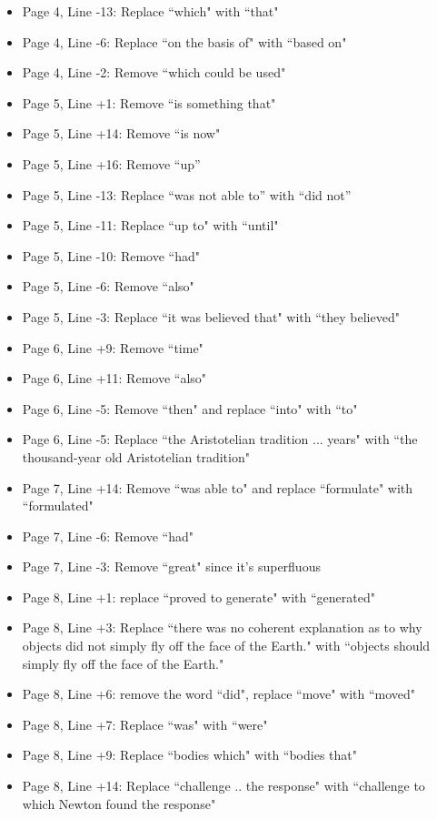 \documentclass[11pt]{article}
\begin{document}
\begin{itemize}
\begin{itemize}
		\item Page 4, Line -13: Replace ``which" with ``that"
		\item Page 4, Line -6: Replace ``on the basis of" with ``based on"
		\item Page 4, Line -2: Remove ``which could be used"
		\item Page 5, Line +1: Remove ``is something that"
		\item Page 5, Line +14: Remove ``is now"
		\item Page 5, Line +16: Remove ``up”
		\item Page 5, Line -13: Replace ``was not able to” with ``did not”
		\item Page 5, Line -11: Replace ``up to" with ``until"
		\item Page 5, Line -10: Remove ``had"
		\item Page 5, Line -6: Remove ``also"
		\item Page 5, Line -3: Replace ``it was believed that" with ``they believed"
		\item Page 6, Line +9: Remove ``time"
		\item Page 6, Line +11: Remove ``also"
		\item Page 6, Line -5: Remove ``then" and replace ``into" with ``to"
		\item Page 6, Line -5: Replace ``the Aristotelian tradition ... years" with ``the thousand-year old Aristotelian tradition"
		\item Page 7, Line +14: Remove ``was able to" and replace ``formulate" with ``formulated"
		\item Page 7, Line -6: Remove ``had"
		\item Page 7, Line -3: Remove ``great" since it's superfluous
		\item Page 8, Line +1: replace ``proved to generate" with ``generated"
		\item Page 8, Line +3: Replace ``there was no coherent explanation as to why objects did not simply fly off the face of the Earth." with ``objects should simply fly off the face of the Earth."
		\item Page 8, Line +6: remove the word ``did", replace ``move" with ``moved"
		\item Page 8, Line +7: Replace ``was" with ``were"
		\item Page 8, Line +9: Replace ``bodies which" with ``bodies that"
		\item Page 8, Line +14: Replace ``challenge .. the response" with ``challenge to which Newton found the response"

\end{itemize}
\end{itemize}
\end{document}
